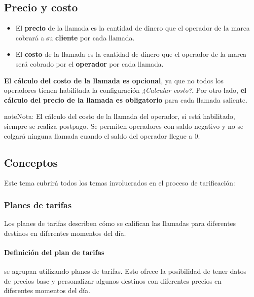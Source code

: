 \documentclass[letterpaper,10pt,spanish]{sphinxmanual}
\begin{document}
\subsection{Precio y costo}
\label{administration_portal/brand/billing/index:price-and-cost}\begin{itemize}
\item {} 
El \textbf{precio} de la llamada es la cantidad de dinero que el operador de la marca cobrará a su \textbf{cliente} por cada llamada.

\item {} 
El \textbf{costo} de la llamada es la cantidad de dinero que el operador de la marca será cobrado por el \textbf{operador} por cada llamada.

\end{itemize}

\textbf{El cálculo del costo de la llamada es opcional}, ya que no todos los operadores tienen habilitada la configuración \emph{¿Calcular costo?}. Por otro lado, \textbf{el cálculo del precio de la llamada es obligatorio} para cada llamada saliente.

\begin{notice}{note}{Nota:}
El cálculo del costo de la llamada del operador, si está habilitado, siempre se realiza postpago. Se permiten operadores con saldo negativo y no se colgará ninguna llamada cuando el saldo del operador llegue a 0.
\end{notice}


\subsection{Conceptos}
\label{administration_portal/brand/billing/index:concepts}
Este tema cubrirá todos los temas involucrados en el proceso de tarificación:


\subsubsection{Planes de tarifas}
\label{administration_portal/brand/billing/rating_plans:rating-plans}\label{administration_portal/brand/billing/rating_plans::doc}\label{administration_portal/brand/billing/rating_plans:id1}
Los planes de tarifas describen cómo se califican las llamadas para diferentes destinos en diferentes momentos del día.


\paragraph{Definición del plan de tarifas}
\label{administration_portal/brand/billing/rating_plans:rating-plan-definition}
{\hyperref[administration_portal/brand/billing/destination_rates:destination\string-rates]{}} se agrupan utilizando planes de tarifas. Esto ofrece la posibilidad de tener datos de precios base y personalizar algunos destinos con diferentes precios en diferentes momentos del día.
\end{document}

